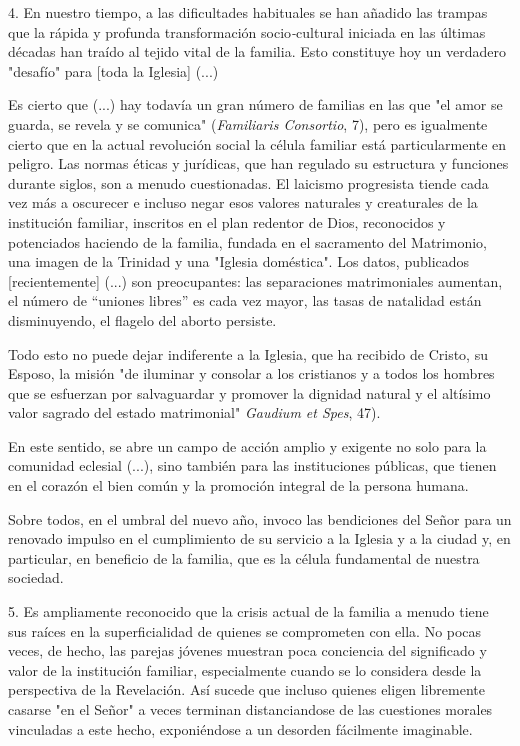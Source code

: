 \begin{body}
\begin{body}
4. En nuestro tiempo, a las dificultades habituales se han añadido las trampas que la rápida y profunda transformación socio\emph{-}cultural iniciada en las últimas décadas han traído al tejido vital de la familia. Esto constituye hoy un verdadero "desafío" para {[}toda la Iglesia{]} (...)

Es cierto que (...) hay todavía un gran número de familias en las que "el amor se guarda, se revela y se comunica" (\emph{Familiaris Consortio}, 7), pero es igualmente cierto que en la actual revolución social la célula familiar está particularmente en peligro. Las normas éticas y jurídicas, que han regulado su estructura y funciones durante siglos, son a menudo cuestionadas. El laicismo progresista tiende cada vez más a oscurecer e incluso negar esos valores naturales y creaturales de la institución familiar, inscritos en el plan redentor de Dios, reconocidos y potenciados haciendo de la familia, fundada en el sacramento del Matrimonio, una imagen de la Trinidad y una "Iglesia doméstica". Los datos, publicados {[}recientemente{]} (...) son preocupantes: las separaciones matrimoniales aumentan, el número de ``uniones libres'' es cada vez mayor, las tasas de natalidad están disminuyendo, el flagelo del aborto persiste.

Todo esto no puede dejar indiferente a la Iglesia, que ha recibido de Cristo, su Esposo, la misión "de iluminar y consolar a los cristianos y a todos los hombres que se esfuerzan por salvaguardar y promover la dignidad natural y el altísimo valor sagrado del estado matrimonial" \emph{Gaudium et Spes}, 47).

En este sentido, se abre un campo de acción amplio y exigente no solo para la comunidad eclesial (...), sino también para las instituciones públicas, que tienen en el corazón el bien común y la promoción integral de la persona humana.

Sobre todos, en el umbral del nuevo año, invoco las bendiciones del Señor para un renovado impulso en el cumplimiento de su servicio a la Iglesia y a la ciudad y, en particular, en beneficio de la familia, que es la célula fundamental de nuestra sociedad.

5. Es ampliamente reconocido que la crisis actual de la familia a menudo tiene sus raíces en la superficialidad de quienes se comprometen con ella. No pocas veces, de hecho, las parejas jóvenes muestran poca conciencia del significado y valor de la institución familiar, especialmente cuando se lo considera desde la perspectiva de la Revelación. Así sucede que incluso quienes eligen libremente casarse "en el Señor" a veces terminan distanciandose de las cuestiones morales vinculadas a este hecho, exponiéndose a un desorden fácilmente imaginable.


\end{body}
\end{body}

